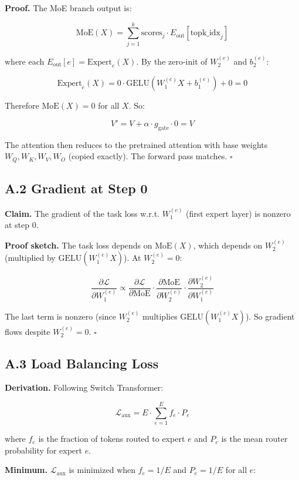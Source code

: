 \textbf{Proof.} The MoE branch output is:

\[
\text{MoE}(X) = \sum_{j=1}^{k} \text{scores}_j \cdot E_{\text{out}}[\text{topk\_idx}_j]
\]

where each $E_\text{out}[e] = \text{Expert}_e(X)$. By the zero-init of 
$W_2^{(e)}$ and $b_2^{(e)}$:

\[
\text{Expert}_e(X) = 0 \cdot \text{GELU}(W_1^{(e)} X + b_1^{(e)}) + 0 = 0
\]

Therefore $\text{MoE}(X) = 0$ for all $X$. So:

\[
V' = V + \alpha \cdot g_\text{gate} \cdot 0 = V
\]

The attention then reduces to the pretrained attention with base weights 
$W_Q, W_K, W_V, W_O$ (copied exactly). The forward pass matches. $\square$

\subsection{A.2 Gradient at Step 0}

\textbf{Claim.} The gradient of the task loss w.r.t. $W_1^{(e)}$ (first expert 
layer) is nonzero at step 0.

\textbf{Proof sketch.} The task loss depends on $\text{MoE}(X)$, which depends 
on $W_2^{(e)}$ (multiplied by $\text{GELU}(W_1^{(e)} X)$). At $W_2^{(e)} = 0$:

\[
\frac{\partial \mathcal{L}}{\partial W_1^{(e)}} \propto \frac{\partial \mathcal{L}}{\partial \text{MoE}} \cdot \frac{\partial \text{MoE}}{\partial W_2^{(e)}} \cdot \frac{\partial W_2^{(e)}}{\partial W_1^{(e)}}
\]

The last term is nonzero (since $W_2^{(e)}$ multiplies $\text{GELU}(W_1^{(e)} X)$). 
So gradient flows despite $W_2^{(e)} = 0$. $\square$

\subsection{A.3 Load Balancing Loss}

\textbf{Derivation.} Following Switch Transformer:

\[
\mathcal{L}_\text{aux} = E \cdot \sum_{e=1}^{E} f_e \cdot P_e
\]

where $f_e$ is the fraction of tokens routed to expert $e$ and $P_e$ is the 
mean router probability for expert $e$.

\textbf{Minimum.} $\mathcal{L}_\text{aux}$ is minimized when $f_e = 1/E$ and 
$P_e = 1/E$ for all $e$:

